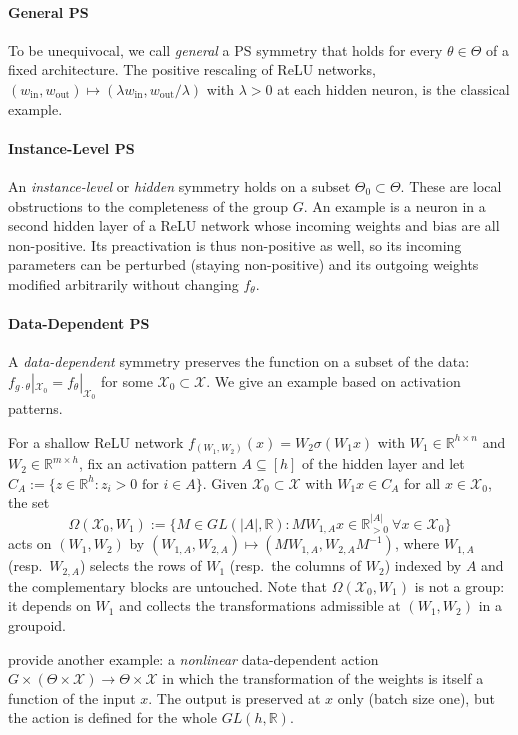 \documentclass[mathematics,review,submit,moreauthors]{Definitions/mdpi}
\begin{document}
\paragraph{General PS}
To be unequivocal, we call \emph{general} a PS symmetry that holds for every $\theta\in\Theta$ of a fixed architecture.
The positive rescaling of ReLU networks, $(w_{\mathrm{in}}, w_{\mathrm{out}})\mapsto(\lambda w_{\mathrm{in}}, w_{\mathrm{out}}/\lambda)$ with $\lambda>0$ at each hidden neuron, is the classical example.

\paragraph{Instance-Level PS}
An \emph{instance-level} or \emph{hidden} \citep{grigsby2023p4icml} symmetry holds on a subset $\Theta_0\subset\Theta$.
These are local obstructions to the completeness of the group $G$.
An example is a neuron in a second hidden layer of a ReLU network whose incoming weights and bias are all non-positive.
Its preactivation is thus non-positive as well, so its incoming parameters can be perturbed (staying non-positive) and its outgoing weights modified arbitrarily without changing $f_\theta$.

\paragraph{Data-Dependent PS}
A \emph{data-dependent} symmetry preserves the function on a subset of the data: $f_{g\cdot\theta}|_{\mathcal{X}_0}=f_\theta|_{\mathcal{X}_0}$ for some $\mathcal{X}_0\subset\mathcal{X}$.
We give an example based on activation patterns.
\begin{Example}\label{ex:data-PS-GL-activation}
    For a shallow ReLU network $f_{(W_1,W_2)}(x)=W_2\sigma(W_1x)$ with $W_1\in\mathbb{R}^{h\times n}$ and $W_2\in\mathbb{R}^{m\times h}$, fix an activation pattern $A\subseteq[h]$ of the hidden layer and let $C_A:=\{z\in\mathbb{R}^h : z_i>0 \text{ for } i\in A\}$.
    Given $\mathcal{X}_0\subset\mathcal{X}$ with $W_1x\in C_A$ for all $x\in \mathcal{X}_0$, the set
    \begin{equation*}
        \Omega(\mathcal{X}_0,W_1):=\big\{M\in GL(|A|,\mathbb{R}) : MW_{1,A}x\in\mathbb{R}^{|A|}_{>0}\ \forall x\in \mathcal{X}_0\big\}
    \end{equation*}
    acts on $(W_1,W_2)$ by $(W_{1,A}, W_{2,A})\mapsto(MW_{1,A}, W_{2,A}M^{-1})$, where $W_{1,A}$ (resp.\ $W_{2,A}$) selects the rows of $W_1$ (resp.\ the columns of $W_2$) indexed by $A$ and the complementary blocks are untouched.
    Note that $\Omega(\mathcal{X}_0,W_1)$ is not a group: it depends on $W_1$ and collects the transformations admissible at $(W_1,W_2)$ in a groupoid.
\end{Example}
\citet{zhao2023a} provide another example: a \emph{nonlinear} data-dependent action $G\times(\Theta\times\mathcal{X})\to\Theta\times\mathcal{X}$ in which the transformation of the weights is itself a function of the input $x$.
The output is preserved at $x$ only (batch size one), but the action is defined for the whole $GL(h,\mathbb{R})$.
\end{document}
